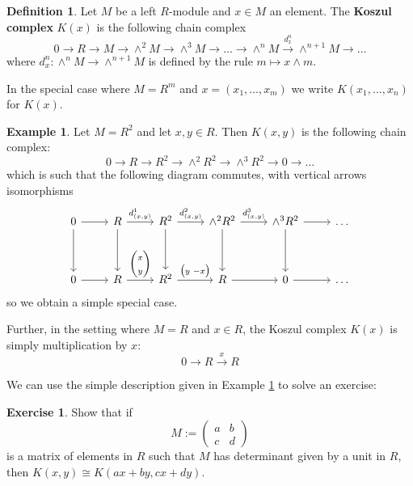 \documentclass[12pt]{article}
\theoremstyle{plain}
\theoremstyle{definition}
\newtheorem{defn}[thm]{Definition} %
\newtheorem{exercise}[thm]{Exercise}
\newtheorem{example}[thm]{Example}
\newcommand{\lto}{\longrightarrow}
\begin{document}
	\begin{defn}\label{def:koszul_complex}
		Let $M$ be a left $R$-module and $x \in M$ an element. The \textbf{Koszul complex} $K(x)$ is the following chain complex
		\begin{equation}
			0 \lto R \lto M \lto \wedge^2 M \lto \wedge^3 M \lto \hdots \lto \wedge^n M \stackrel{d_x^n}{\lto} \wedge^{n+1}M \lto \hdots
		\end{equation}
		where $d_x^n: \wedge^n M \lto \wedge^{n+1}M$ is defined by the rule $m \longmapsto x \wedge m$.
		
		In the special case where $M = R^m$ and $x = (x_1,...,x_m)$ we write $K(x_1,...,x_n)$ for $K(x)$.
	\end{defn}
	\begin{example}\label{ex:K(x,y)}
		Let $M = R^2$ and let $x,y \in R$. Then $K(x,y)$ is the following chain complex:
		\begin{equation}
			0 \lto R \lto R^2 \lto \wedge^2 R^2 \lto \wedge^3 R^2 \lto 0 \lto \hdots
		\end{equation}
		which is such that the following diagram commutes, with vertical arrows isomorphisms
		\begin{equation}
			\begin{tikzcd}[row sep = huge]
				0\arrow[r]\arrow[d] & R\arrow[r,"{d_{(x,y)}^1}"]\arrow[d] & R^2\arrow[r,"{d_{(x,y)}^2}"]\arrow[d] &\wedge^2 R^2\arrow[r,"{d_{(x,y)}^3}"]\arrow[d] & \wedge^3 R^2\arrow[d]\arrow[r] &  \hdots\\
				0\arrow[r] & R\arrow[r,"{\begin{pmatrix}
						x\\
						y
					\end{pmatrix}
				}"] & R^2\arrow[r,"{\begin{pmatrix}
						y \text{  } -x
					\end{pmatrix}
				}"]  & R\arrow[r] & 0\arrow[r] & \hdots
			\end{tikzcd}
		\end{equation}
		so we obtain a simple special case.
		
		Further, in the setting where $M = R$ and $x \in R$, the Koszul complex $K(x)$ is simply multiplication by $x$:
		\begin{equation}
			0 \lto R \stackrel{x}{\lto} R
		\end{equation}
	\end{example}
	We can use the simple description given in Example \ref{ex:K(x,y)} to solve an exercise:
	\begin{exercise}
		Show that if
		\begin{equation}
			M := \begin{pmatrix}
				a & b\\
				c & d
			\end{pmatrix}
		\end{equation}
		is a matrix of elements in $R$ such that $M$ has determinant given by a unit in $R$, then $K(x,y) \cong K(ax + by, cx + dy)$.
	\end{exercise}
\end{document}
